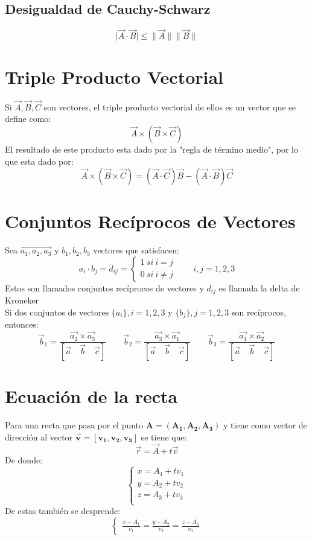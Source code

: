 \documentclass[a4paper]{article}
\newcommand{\abs}[1]{\lVert #1 \rVert}
\begin{document}
\subsection{Desigualdad de Cauchy-Schwarz}
\begin{equation}
\tag{Desigualdad de Cauchy-Schwarz}
\lvert \vec{A}\cdot\vec{B} \rvert \leqslant \abs{\vec{A}}\abs{\vec{B}}
\end{equation}
\section{Triple Producto Vectorial}
Si $\vec{A},\vec{B},\vec{C}$ son vectores, el triple producto vectorial de ellos es un vector
que se define como:
\[\vec{A}\times(\vec{B}\times\vec{C})\]
El resultado de este producto esta dado por la "regla de término medio", por lo que esta dado por:
\[\vec{A}\times(\vec{B}\times\vec{C})=(\vec{A}\cdot\vec{C})\vec{B}-(\vec{A}\cdot\vec{B})\vec{C}\]
\section{Conjuntos Recíprocos de Vectores}
Sea $\vec{a_1,a_2,a_3}$ y $b_1,b_2,b_3$ vectores que satisfacen:
\[a_i\cdot b_j=d_{ij}=
\begin{cases}
1\ si\ i=j\\
0\ si\ i\neq j
\end{cases}
\qquad i,j=1,2,3\]
Estos son llamados conjuntos recíprocos de vectores y $d_{ij}$ es llamada la delta
de Kroneker\\
Si dos conjuntos de vectores $\{a_i\},i=1,2,3$ y $\{b_j\},j=1,2,3$ son recíprocos, entonces:
\[\vec{b}_1=\frac{\vec{a_2}\times\vec{a_3}}{[\vec{a}\quad\vec{b}\quad\vec{c}]}\qquad
\vec{b}_2=\frac{\vec{a_3}\times\vec{a_1}}{[\vec{a}\quad\vec{b}\quad\vec{c}]}
\qquad
\vec{b}_3=\frac{\vec{a_1}\times\vec{a_2}}{[\vec{a}\quad\vec{b}\quad\vec{c}]}
\]
\section{Ecuación de la recta}
Para una recta que pasa por el punto $\mathbf{A=(A_1,A_2,A_3)}$ y tiene como vector de
dirección al vector $\mathbf{\vec{v}=[v_1,v_2,v_3]}$ se tiene que:
\[\vec{r}=\vec{A}+t\vec{v}\]
De donde:
\[\begin{cases}
\tag{Ecuaciones paramétricas de la recta}
x=A_1+tv_1\\
y=A_2+tv_2\\
z=A_3+tv_3\\
\end{cases}
\]
De estas también se desprende:
\[\begin{cases}
\tag{Ecuaciones simétricas de la recta}
\frac{x-A_1}{v_1}=\frac{y-A_2}{v_2}=\frac{z-A_3}{v_3}
\end{cases}
\]
\end{document}
